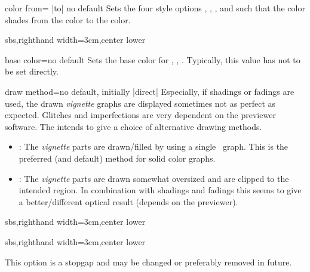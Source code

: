 \begin{vigTcbKey}[][doc new=2016-04-22]{color from}{= |to| }{no default}
  Sets the four style options
  ,
  ,
  , and
  such that the color shades from the
   color to the  color.
\begin{dispExample*}{sbs,righthand width=3cm,center lower}
\end{dispExample*}
\end{vigTcbKey}



\begin{vigTcbKey}[][doc new=2016-04-22]{base color}{=}{no default}
  Sets the base color for ,
  , .
  Typically, this value has not to be set directly.
\end{vigTcbKey}


\clearpage
\begin{vigTcbKey}[][doc new=2016-04-22]{draw method}{=\textbar{}}{no default, initially |direct|}
  Especially, if shadings or fadings are used, the drawn \emph{vignette}
  graphs are displayed sometimes not as perfect as expected. Glitches and
  imperfections are very dependent on the previewer software.
  The  intends to give a choice of alternative
  drawing methods.
  \begin{itemize}
  \item{}: The \emph{vignette} parts are drawn/filled
    by using a single \tikzname\ graph. This is the preferred (and default)
    method for solid color graphs.
  \item{}: The \emph{vignette} parts are drawn somewhat
    oversized and are clipped to the intended region.
    In combination with shadings and fadings this seems to give a
    better/different optical result (depends on the previewer).
  \end{itemize}
\begin{dispExample*}{sbs,righthand width=3cm,center lower}
\end{dispExample*}
\begin{dispExample*}{sbs,righthand width=3cm,center lower}
\end{dispExample*}

\begin{marker}
This option is a stopgap and may be changed or preferably removed in
future.
\end{marker}
\end{vigTcbKey}



